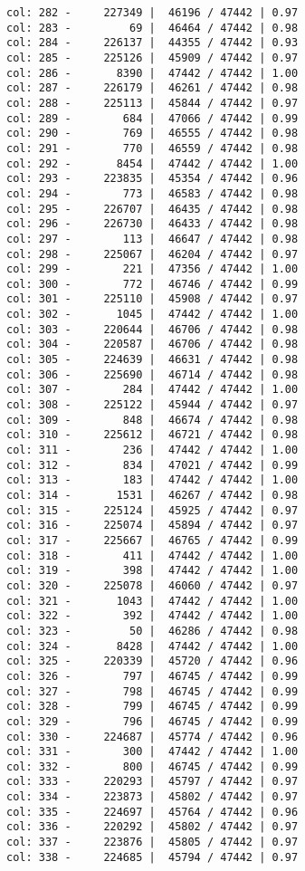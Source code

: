 \documentclass[11pt]{article}
\begin{document}
\begin{Verbatim}[commandchars=\\\{\}]
col: 282 -     227349 |  46196 / 47442 | 0.97
col: 283 -         69 |  46464 / 47442 | 0.98
col: 284 -     226137 |  44355 / 47442 | 0.93
col: 285 -     225126 |  45909 / 47442 | 0.97
col: 286 -       8390 |  47442 / 47442 | 1.00
col: 287 -     226179 |  46261 / 47442 | 0.98
col: 288 -     225113 |  45844 / 47442 | 0.97
col: 289 -        684 |  47066 / 47442 | 0.99
col: 290 -        769 |  46555 / 47442 | 0.98
col: 291 -        770 |  46559 / 47442 | 0.98
col: 292 -       8454 |  47442 / 47442 | 1.00
col: 293 -     223835 |  45354 / 47442 | 0.96
col: 294 -        773 |  46583 / 47442 | 0.98
col: 295 -     226707 |  46435 / 47442 | 0.98
col: 296 -     226730 |  46433 / 47442 | 0.98
col: 297 -        113 |  46647 / 47442 | 0.98
col: 298 -     225067 |  46204 / 47442 | 0.97
col: 299 -        221 |  47356 / 47442 | 1.00
col: 300 -        772 |  46746 / 47442 | 0.99
col: 301 -     225110 |  45908 / 47442 | 0.97
col: 302 -       1045 |  47442 / 47442 | 1.00
col: 303 -     220644 |  46706 / 47442 | 0.98
col: 304 -     220587 |  46706 / 47442 | 0.98
col: 305 -     224639 |  46631 / 47442 | 0.98
col: 306 -     225690 |  46714 / 47442 | 0.98
col: 307 -        284 |  47442 / 47442 | 1.00
col: 308 -     225122 |  45944 / 47442 | 0.97
col: 309 -        848 |  46674 / 47442 | 0.98
col: 310 -     225612 |  46721 / 47442 | 0.98
col: 311 -        236 |  47442 / 47442 | 1.00
col: 312 -        834 |  47021 / 47442 | 0.99
col: 313 -        183 |  47442 / 47442 | 1.00
col: 314 -       1531 |  46267 / 47442 | 0.98
col: 315 -     225124 |  45925 / 47442 | 0.97
col: 316 -     225074 |  45894 / 47442 | 0.97
col: 317 -     225667 |  46765 / 47442 | 0.99
col: 318 -        411 |  47442 / 47442 | 1.00
col: 319 -        398 |  47442 / 47442 | 1.00
col: 320 -     225078 |  46060 / 47442 | 0.97
col: 321 -       1043 |  47442 / 47442 | 1.00
col: 322 -        392 |  47442 / 47442 | 1.00
col: 323 -         50 |  46286 / 47442 | 0.98
col: 324 -       8428 |  47442 / 47442 | 1.00
col: 325 -     220339 |  45720 / 47442 | 0.96
col: 326 -        797 |  46745 / 47442 | 0.99
col: 327 -        798 |  46745 / 47442 | 0.99
col: 328 -        799 |  46745 / 47442 | 0.99
col: 329 -        796 |  46745 / 47442 | 0.99
col: 330 -     224687 |  45774 / 47442 | 0.96
col: 331 -        300 |  47442 / 47442 | 1.00
col: 332 -        800 |  46745 / 47442 | 0.99
col: 333 -     220293 |  45797 / 47442 | 0.97
col: 334 -     223873 |  45802 / 47442 | 0.97
col: 335 -     224697 |  45764 / 47442 | 0.96
col: 336 -     220292 |  45802 / 47442 | 0.97
col: 337 -     223876 |  45805 / 47442 | 0.97
col: 338 -     224685 |  45794 / 47442 | 0.97

\end{Verbatim}
\end{document}

